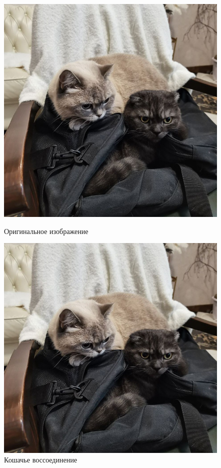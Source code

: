 \documentclass[a4paper, 16pt]{article}
\begin{document}
\newpage
\begin{figure}[!htb]
    \centering
    \begin{minipage}{0.45\textwidth}
        \centering
        \includegraphics[scale=0.3]{img1.jpg}
        \captionsetup{skip=0pt}
        \caption{Оригинальное изображение}
        \label{Рис:24}
    \end{minipage}
    \begin{minipage}{0.45\textwidth}
        \centering
        \includegraphics[scale=0.3]{join.png}
        \captionsetup{skip=0pt}
        \caption{Кошачье воссоединение}
        \label{Рис:25}
    \end{minipage}
\end{figure}
\end{document}
